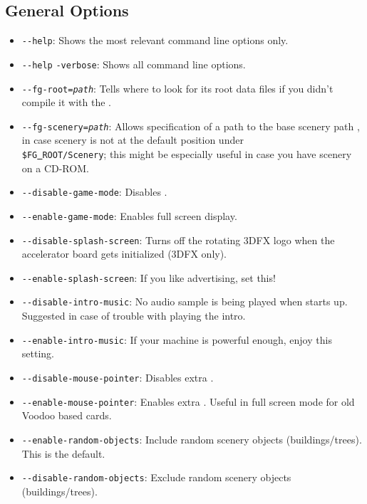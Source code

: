 \subsection{General Options}\label{generaloptions}
\begin{itemize}
\item{\texttt{-$ $-help}}: Shows the most relevant command line options only.
\item{\texttt{-$ $-help} \texttt{-verbose}}: Shows all command line options.
\item{\texttt{-$ $-fg-root={\it path}}}: Tells \FlightGear{} where to look for its root data
  files if you didn't compile it with the .
\item{\texttt{-$ $-fg-scenery={\it path}}}: Allows specification of a path to the base scenery path , in case scenery is not at the default position under\\
 \texttt{\$FG\underline{~}ROOT/Scenery}; this might be especially useful in case you
have scenery on a CD-ROM.
\item{\texttt{-$ $-disable-game-mode}}: Disables .
\item{\texttt{-$ $-enable-game-mode}}: Enables full screen display.
\item{\texttt{-$ $-disable-splash-screen}}: Turns off the rotating 3DFX logo
 when the accelerator board gets initialized (3DFX only).
\item{\texttt{-$ $-enable-splash-screen}}: If you like advertising, set this!
\item{\texttt{-$ $-disable-intro-music}}: No audio sample is being played when
  \FlightGear{} starts up. Suggested in case of trouble with playing the intro.
\item{\texttt{-$ $-enable-intro-music}}: If your machine is powerful enough, enjoy
  this setting.
\item{\texttt{-$ $-disable-mouse-pointer}}: Disables extra .
\item{\texttt{-$ $-enable-mouse-pointer}}: Enables extra . Useful in
full screen mode for old Voodoo based cards.
\item{\texttt{-$ $-enable-random-objects}}: Include random scenery objects (buildings/trees). This is the default.
\item{\texttt{-$ $-disable-random-objects}}: Exclude random scenery objects (buildings/trees).

\end{itemize}
